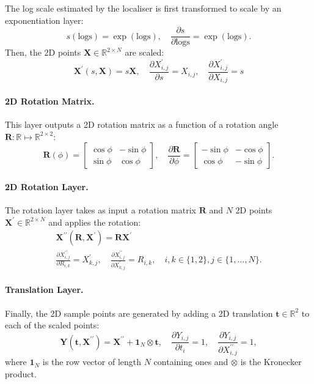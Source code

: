 \documentclass[runningheads]{llncs}
\newcommand{\R}{\mathbb{R}}
\newcommand{\logs}{\textrm{logs}}
\begin{document}
The log scale estimated by the localiser is first transformed to scale by an exponentiation layer:
\begin{equation*}
    s(\logs)=\exp(\logs),\quad \frac{\partial s}{\partial \logs}=\exp(\logs).
\end{equation*}
Then, the 2D points $\mathbf{X}\in\R^{2\times N}$ are scaled:
\begin{equation*}
    \mathbf{X}^{\prime}(s,\mathbf{X})=s\mathbf{X},\quad \frac{\partial X^{\prime}_{i,j}}{\partial s}=X_{i,j},\quad \frac{\partial X^{\prime}_{i,j}}{\partial X_{i,j}}=s
\end{equation*}

\paragraph{2D Rotation Matrix.}
This layer outputs a 2D rotation matrix as a function of a rotation angle $\mathbf{R}:\R\mapsto\R^{2\times 2}$:
\begin{equation}
    \mathbf{R}(\phi) = \begin{bmatrix}\cos\phi & -\sin\phi \\ \sin\phi & \cos\phi \end{bmatrix},\quad
    \frac{\partial \mathbf{R}}{\partial \phi} = \begin{bmatrix}-\sin\phi & -\cos\phi \\ \cos\phi & -\sin\phi \end{bmatrix}.
\end{equation}

\paragraph{2D Rotation Layer.}

The rotation layer takes as input a rotation matrix $\mathbf{R}$ and $N$ 2D points $\mathbf{X}^{\prime}\in\R^{2\times N}$ and applies the rotation:
\begin{gather*}
    \mathbf{X}^{\prime\prime}(\mathbf{R},\mathbf{X}^{\prime})=\mathbf{RX}^{\prime}\\
    \frac{\partial X^{\prime\prime}_{i,j}}{\partial R_{i,k}}=X^{\prime}_{k,j},\quad \frac{\partial X^{\prime\prime}_{i,j}}{\partial X^{\prime}_{k,j}}=R_{i,k},\quad i,k\in\{1,2\}, j\in\{1,\dots,N\}.
\end{gather*}

\paragraph{Translation Layer.}
Finally, the 2D sample points are generated by adding a 2D translation $\mathbf{t}\in\R^2$ to each of the scaled points:
\begin{equation*}
    \mathbf{Y}(\mathbf{t},\mathbf{X}^{\prime\prime})=\mathbf{X}^{\prime\prime}+\mathbf{1}_{N}\otimes \mathbf{t},\quad \frac{\partial Y_{i,j}}{\partial t_i}=1,\quad \frac{\partial Y_{i,j}}{\partial X^{\prime\prime}_{i,j}}=1,
\end{equation*}
where $\mathbf{1}_{N}$ is the row vector of length $N$ containing ones and $\otimes$ is the Kronecker product.
\end{document}
